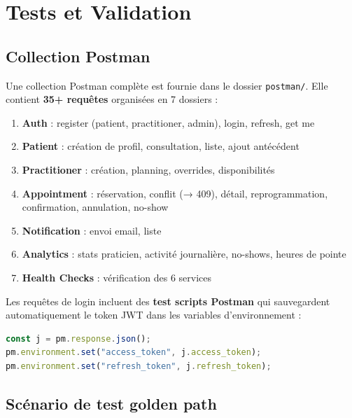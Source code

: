 \documentclass[12pt,a4paper]{article}
\begin{document}
\section{Tests et Validation}

\subsection{Collection Postman}

Une collection Postman complète est fournie dans le dossier \texttt{postman/}. Elle contient \textbf{35+ requêtes} organisées en 7 dossiers :

\begin{enumerate}
  \item \textbf{Auth} : register (patient, practitioner, admin), login, refresh, get me
  \item \textbf{Patient} : création de profil, consultation, liste, ajout antécédent
  \item \textbf{Practitioner} : création, planning, overrides, disponibilités
  \item \textbf{Appointment} : réservation, conflit (→ 409), détail, reprogrammation, confirmation, annulation, no-show
  \item \textbf{Notification} : envoi email, liste
  \item \textbf{Analytics} : stats praticien, activité journalière, no-shows, heures de pointe
  \item \textbf{Health Checks} : vérification des 6 services
\end{enumerate}

Les requêtes de login incluent des \textbf{test scripts Postman} qui sauvegardent automatiquement le token JWT dans les variables d'environnement :

\begin{lstlisting}[language=JavaScript, caption={Auto-save du token — Postman test script}]
const j = pm.response.json();
pm.environment.set("access_token", j.access_token);
pm.environment.set("refresh_token", j.refresh_token);
\end{lstlisting}

\subsection{Scénario de test golden path}
\end{document}
